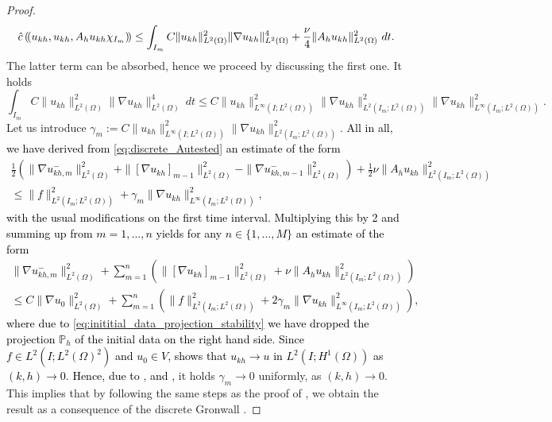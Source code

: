 \documentclass{m2an}
\newcommand\Red[1]{\textcolor{darkred}{#1}}
\newcommand\blue[1]{\textcolor{black}{#1}}
\newcommand{\chatIO}[1]{\hat c \left(\!\left( #1 \right)\!\right)}
\newcommand{\ukh}{u_{kh}}
\newcommand{\Ph}{\mathbb P_h}
\begin{document}
\begin{proof}
\begin{equation*}
  \chatIO{\blue{\ukh,\ukh,A_h \ukh \chi_{I_m}}} \le  
   \int_{I_m} C \|\ukh\|_{L^2(\Omega)}^2 \|\nabla \ukh\|_{L^2(\Omega)}^4 
   + \frac{\nu}{4} \|A_h \ukh\|_{L^2(\Omega)}^2 \ dt.
\end{equation*}
The latter term can be absorbed, hence we proceed by discussing the first one. It holds
\begin{equation*}
   \int_{I_m} C \|\ukh\|_{L^2(\Omega)}^2 \|\nabla \ukh\|_{L^2(\Omega)}^4 \ dt
   \le C\|\ukh\|_{L^\infty(I;L^2(\Omega))}^2\|\nabla \ukh\|_{L^2(I_m;L^2(\Omega))}^2
   \|\nabla \ukh\|_{L^\infty(I_m;L^2(\Omega))}^2.
\end{equation*}
Let us introduce $\gamma_m := C\|\ukh\|_{L^\infty(I;L^2(\Omega))}^2\|\nabla \ukh\|_{L^2(I_m;L^2(\Omega))}^2$.
\blue{All in all, we have derived from \eqref{eq:discrete_Autested} an estimate of the form
  \begin{align*}
    \frac{1}{2} \left(\|\nabla u_{kh,m}^-\|_{L^2(\Omega)}^2  + \|[\nabla \ukh]_{m-1}\|_{L^2(\Omega)}^2 
    - \|\nabla u_{kh,m-1}^-\|_{L^2(\Omega)}^2 \right)
    + \frac{1}{2}\nu \|A_h \ukh\|_{L^2(I_m;L^2(\Omega))}^2\\
    \le
    \|f\|_{L^2(I_m;L^2(\Omega))}^2 
    + \gamma_m \|\nabla \ukh\|_{L^\infty(I_m;L^2(\Omega))}^2,
  \end{align*}
  with the usual modifications on the first time interval.
  Multiplying this by 2 and summing up from $m=1,...,n$ yields for any $n \in \{1,...,M\}$ an 
  estimate of the form
  \begin{align*}
    \|\nabla u_{kh,m}^-\|_{L^2(\Omega)}^2  + \sum_{m=1}^n\left(\|[\nabla \ukh]_{m-1}\|_{L^2(\Omega)}^2 
    + \nu \|A_h \ukh\|_{L^2(I_m;L^2(\Omega))}^2\right)\\
    \le
    C \|\nabla u_0\|_{L^2(\Omega)}^2
    + \sum_{m=1}^n \left(\|f\|_{L^2(I_m;L^2(\Omega))}^2 
    + 2\gamma_m \|\nabla \ukh\|_{L^\infty(I_m;L^2(\Omega))}^2\right),
  \end{align*}
  where due to \eqref{eq:inititial_data_projection_stability} we have dropped the projection $\Ph$ of the 
  initial data on the right hand side.
  Since $f \in L^2(I;L^2(\Omega)^2)$ and $u_0 \in V$, \Cref{thm:nav_stokes_l2h1} shows
  that $\ukh \to u$ in $L^2(I;H^1(\Omega))$ as $(k,h)\to 0$.}
  \blue{Hence, due to} , \blue{and ,}
it holds $\gamma_m \to 0$ uniformly, as $(k,h) \to 0$.
This implies that by following the same steps as the proof of ,
we obtain the result as a consequence of the discrete Gronwall .
\end{proof}
\end{document}

